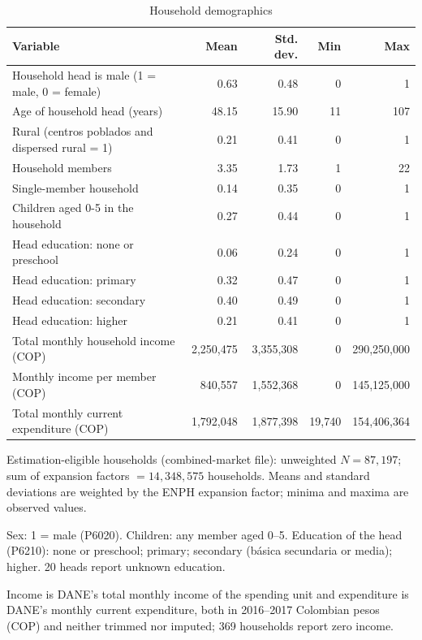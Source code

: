 \begin{table}[!htbp]
\centering
\begin{threeparttable}
\caption{Household demographics}
\label{tab:demographics}
\small
\begin{tabular}{lrrrr}
\toprule
Variable & Mean & Std. dev. & Min & Max \\
\midrule
Household head is male (1 = male, 0 = female) & 0.63 & 0.48 & 0 & 1 \\
Age of household head (years) & 48.15 & 15.90 & 11 & 107 \\
Rural (centros poblados and dispersed rural = 1) & 0.21 & 0.41 & 0 & 1 \\
Household members & 3.35 & 1.73 & 1 & 22 \\
Single-member household & 0.14 & 0.35 & 0 & 1 \\
Children aged 0-5 in the household & 0.27 & 0.44 & 0 & 1 \\
Head education: none or preschool & 0.06 & 0.24 & 0 & 1 \\
Head education: primary & 0.32 & 0.47 & 0 & 1 \\
Head education: secondary & 0.40 & 0.49 & 0 & 1 \\
Head education: higher & 0.21 & 0.41 & 0 & 1 \\
Total monthly household income (COP) & 2,250,475 & 3,355,308 & 0 & 290,250,000 \\
Monthly income per member (COP) & 840,557 & 1,552,368 & 0 & 145,125,000 \\
Total monthly current expenditure (COP) & 1,792,048 & 1,877,398 & 19,740 & 154,406,364 \\
\bottomrule
\end{tabular}
\begin{tablenotes}[flushleft]
\footnotesize
\item Estimation-eligible households (combined-market file): unweighted $N = 87,197$; sum of expansion factors $= 14,348,575$ households. Means and standard deviations are weighted by the ENPH expansion factor; minima and maxima are observed values.
\item Sex: 1 = male (P6020). Children: any member aged 0--5. Education of the head (P6210): none or preschool; primary; secondary (b\'asica secundaria or media); higher. 20 heads report unknown education.
\item Income is DANE's total monthly income of the spending unit and expenditure is DANE's monthly current expenditure, both in 2016--2017 Colombian pesos (COP) and neither trimmed nor imputed; 369 households report zero income.
\end{tablenotes}
\end{threeparttable}
\end{table}
